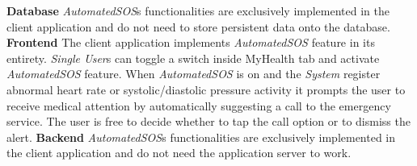\documentclass[titlepage]{article}
\begin{document}
	{\bf Database} \newline
	{\it AutomatedSOS}\textsc{}s functionalities are exclusively implemented in the client application and do not need to store persistent data onto the database.
	\newline
	\newline
	\noindent
	{\bf Frontend} \newline
	The client application implements {\it AutomatedSOS} feature in its entirety. {\it Single User}s can toggle a switch inside MyHealth tab and activate {\it AutomatedSOS} feature. When {\it AutomatedSOS} is on and the {\it System} register abnormal heart rate or systolic/diastolic pressure activity it prompts the user to receive medical attention by automatically suggesting a call to the emergency service. The user is free to decide whether to tap the call option or to dismiss the alert.
	\newline
	\newline
	\noindent
	{\bf Backend} \newline
	{\it AutomatedSOS}\textsc{}s functionalities are exclusively implemented in the client application and do not need the application server to work.
	
	
\end{document}
